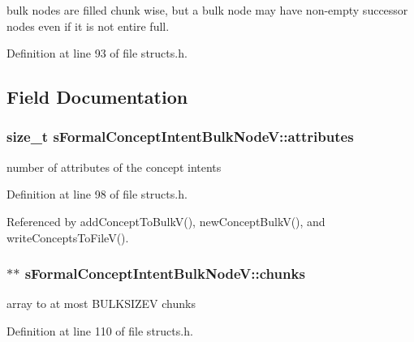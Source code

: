 bulk nodes are filled chunk wise, but a bulk node may have non-\/empty successor nodes even if it is not entire full. 

\-Definition at line 93 of file structs.\-h.



\subsection{\-Field \-Documentation}
\hypertarget{structsFormalConceptIntentBulkNodeV_a0bcc56cc39eb49a954c136099d6e46e7}{
\subsubsection[{attributes}]{\setlength{\rightskip}{0pt plus 5cm}size\-\_\-t {\bf s\-Formal\-Concept\-Intent\-Bulk\-Node\-V\-::attributes}}}\label{structsFormalConceptIntentBulkNodeV_a0bcc56cc39eb49a954c136099d6e46e7}


number of attributes of the concept intents 



\-Definition at line 98 of file structs.\-h.



\-Referenced by add\-Concept\-To\-Bulk\-V(), new\-Concept\-Bulk\-V(), and write\-Concepts\-To\-File\-V().

\hypertarget{structsFormalConceptIntentBulkNodeV_a0e2dad46489f048d39181e59eb1c6039}{
\subsubsection[{chunks}]{$\ast$$\ast$ {\bf s\-Formal\-Concept\-Intent\-Bulk\-Node\-V\-::chunks}}}\label{structsFormalConceptIntentBulkNodeV_a0e2dad46489f048d39181e59eb1c6039}


array to at most \-B\-U\-L\-K\-S\-I\-Z\-E\-V chunks 



\-Definition at line 110 of file structs.\-h.



